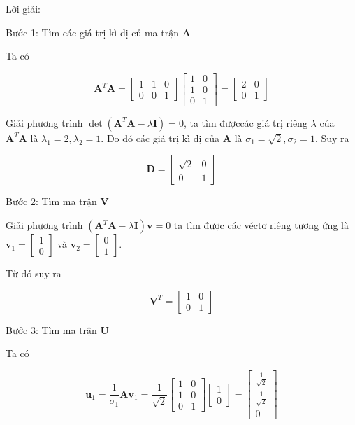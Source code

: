 \documentclass[14pt,oneside,a4paper]{report}
\numberwithin{equation}{section}
\begin{document}
Lời giải:

Bước 1: Tìm các giá trị kì dị củ ma trận $\mathbf{A}$

Ta có

$$
\mathbf{A}^{T} \mathbf{A}=\left[\begin{array}{lll}
1 & 1 & 0 \\
0 & 0 & 1
\end{array}\right]\left[\begin{array}{ll}
1 & 0 \\
1 & 0 \\
0 & 1
\end{array}\right]=\left[\begin{array}{ll}
2 & 0 \\
0 & 1
\end{array}\right]
$$

Giải phương trình $\operatorname{det}\left(\mathbf{A}^{T} \mathbf{A}-\lambda \mathbf{I}\right)=0$, ta tìm đượccác giá trị riêng $\lambda$ của $\mathbf{A}^{T} \mathbf{A}$ là $\lambda_{1}=2, \lambda_{2}=1$. Do đó các giá trị kì dị của $\mathbf{A}$ là $\sigma_{1}=\sqrt{2}, \sigma_{2}=1$. Suy ra

$$
\mathbf{D}=\left[\begin{array}{cc}
\sqrt{2} & 0 \\
0 & 1
\end{array}\right]
$$

Bước 2: Tìm ma trận $\mathbf{V}$

Giải phương trình $\left(\mathbf{A}^{T} \mathbf{A}-\lambda \mathbf{I}\right) \mathbf{v}=0$ ta tìm được các véctơ riêng tương ứng là \\
$\mathbf{v}_{1}=\left[\begin{array}{l}1 \\ 0\end{array}\right]$ và $\mathbf{v}_{2}=\left[\begin{array}{l}0 \\ 1\end{array}\right]$.

Từ đó suy ra

$$
\mathbf{V}^{T}=\left[\begin{array}{ll}
1 & 0 \\
0 & 1
\end{array}\right]
$$

Bước 3: Tìm ma trận $\mathbf{U}$

Ta có

$$
\mathbf{u}_{1}=\frac{1}{\sigma_{1}} \mathbf{A} \mathbf{v}_{1}=\frac{1}{\sqrt{2}}\left[\begin{array}{ll}
1 & 0 \\
1 & 0 \\
0 & 1
\end{array}\right]\left[\begin{array}{l}
1 \\
0
\end{array}\right]=\left[\begin{array}{c}
\frac{1}{\sqrt{2}} \\
\frac{1}{\sqrt{2}} \\
0
\end{array}\right]
$$
\end{document}

